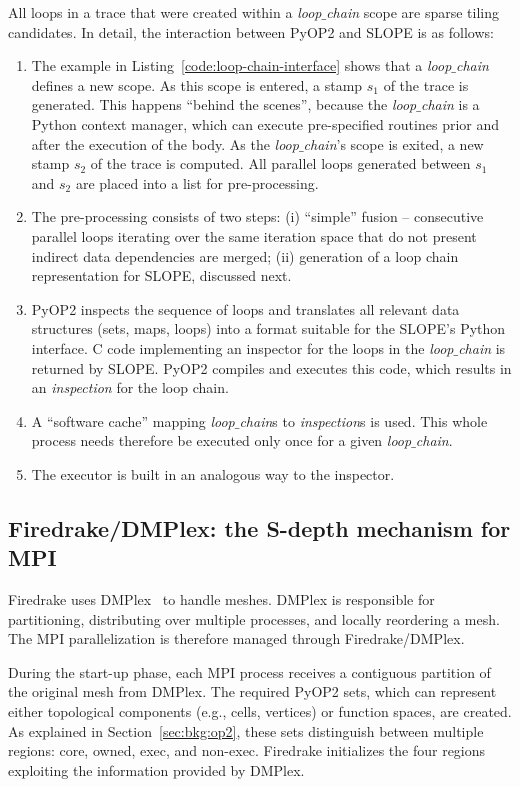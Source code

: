 All loops in a trace that were created within a {\em loop$\_$chain} scope are sparse tiling candidates. In detail, the interaction between PyOP2 and SLOPE is as follows:
\begin{enumerate}
\item The example in Listing~\ref{code:loop-chain-interface} shows that a {\em loop$\_$chain} defines a new scope. As this scope is entered, a stamp $s_1$ of the trace is generated. This happens ``behind the scenes'', because the {\em loop$\_$chain} is a Python context manager, which can execute pre-specified routines prior and after the execution of the body. As the {\em loop$\_$chain}'s scope is exited, a new stamp $s_2$ of the trace is computed. All parallel loops generated between $s_1$ and $s_2$ are placed into a list for pre-processing.
\item The pre-processing consists of two steps: (i) ``simple'' fusion -- consecutive parallel loops iterating over the same iteration space that do not present indirect data dependencies are merged; (ii) generation of a loop chain representation for SLOPE, discussed next.
\item PyOP2 inspects the sequence of loops and translates all relevant data structures (sets, maps, loops) into a format suitable for the SLOPE's Python interface. C code implementing an inspector for the loops in the {\em loop$\_$chain} is returned by SLOPE. PyOP2 compiles and executes this code, which results in an {\em inspection} for the loop chain.
\item A ``software cache'' mapping {\em loop$\_$chain}s to {\em inspection}s is used. This whole process needs therefore be executed only once for a given {\em loop$\_$chain}. 
\item The executor is built in an analogous way to the inspector.
\end{enumerate}


\subsection{Firedrake/DMPlex: the S-depth mechanism for MPI}
\label{sec:tiling:impl-firedrake}
Firedrake uses DMPlex~\citep{dmplex-cite} to handle meshes. DMPlex is responsible for partitioning, distributing over multiple processes, and locally reordering a mesh. The MPI parallelization is therefore managed through Firedrake/DMPlex.

During the start-up phase, each MPI process receives a contiguous partition of the original mesh from DMPlex. The required PyOP2 sets, which can represent either topological components (e.g., cells, vertices) or function spaces, are created. As explained in Section~\ref{sec:bkg:op2}, these sets distinguish between multiple regions: core, owned, exec, and non-exec. Firedrake initializes the four regions exploiting the information provided by DMPlex. 

